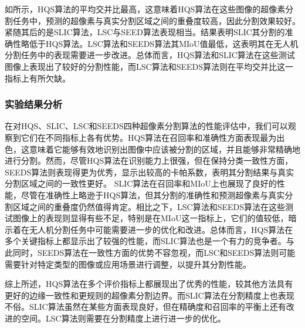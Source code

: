 如所示，HQS算法的平均交并比最高，这意味着HQS算法在这些图像的超像素分割任务中，预测的超像素与真实分割区域之间的重叠度较高，因此分割效果较好。紧随其后的是SLIC算法，LSC与SEED算法表现相当。结果表明SLIC其分割的准确性略低于HQS算法。LSC算法和SEEDS算法其MIoU值最低，这表明其在无人机分割任务中的表现需要进一步改进。总体而言，HQS算法和SLIC算法在这些测试图像上表现出了较好的分割性能，而LSC算法和SEEDS算法则在平均交并比这一指标上有所欠缺。

\subsubsection{实验结果分析}

在对HQS、SLIC、LSC和SEEDS四种超像素分割算法的性能评估中，我们可以观察到它们在不同指标上各有优势。HQS算法在召回率和准确性方面表现最为出色，这意味着它能够有效地识别出图像中应该被分割的区域，并且能够非常精确地进行分割。然而，尽管HQS算法在识别能力上很强，但在保持分类一致性方面，SEEDS算法则表现得更为优秀，显示出较高的卡帕系数，表明其分割结果与真实分割区域之间的一致性更好。
SLIC算法在召回率和MIoU上也展现了良好的性能，尽管在准确性上略逊于HQS算法，但其分割的准确性和预测超像素与真实分割区域之间的重叠度仍然值得肯定。相比之下，LSC算法和SEEDS算法在这些测试图像上的表现则显得有些不足，特别是在MIoU这一指标上，它们的值较低，暗示着在无人机分割任务中可能需要进一步的优化和改进。总体而言，HQS算法在多个关键指标上都显示出了较强的性能，而SLIC算法也是一个有力的竞争者。与此同时，SEEDS算法在一致性方面的优势不容忽视，而LSC和SEEDS算法则可能需要针对特定类型的图像或应用场景进行调整，以提升其分割性能。

综上所述，HQS算法在多个评价指标上都展现出了优秀的性能，较其他方法具有更好的边缘一致性和更规则的超像素分割边界。而SLIC算法在分割精度上也表现不俗。SLIC算法虽然在某些方面表现良好，但在精确度和召回率的平衡上还有改进的空间。LSC算法则需要在分割精度上进行进一步的优化。

